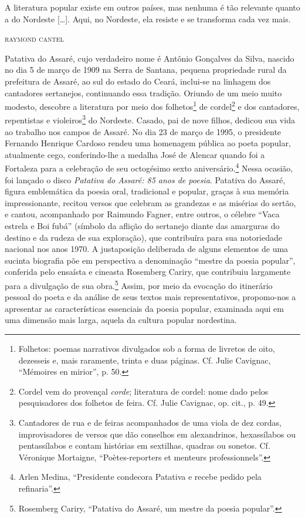 
\epigraph{A literatura popular existe em outros países, mas nenhuma é
tão relevante quanto a do Nordeste [\ldots{}]. Aqui, no Nordeste, ela
resiste e se transforma cada vez mais.}{\textsc{raymond cantel}\footnotemark}

\noindent{}Patativa do Assaré, cujo verdadeiro nome é Antônio Gonçalves da Silva, nascido
no dia 5 de março de 1909 na Serra de Santana, pequena propriedade rural da
prefeitura de Assaré, ao sul do estado do Ceará, inclui-se na linhagem dos
cantadores sertanejos, continuando essa tradição. Oriundo de um meio muito
modesto, descobre a literatura por meio dos folhetos\footnote{ Folhetos: poemas
narrativos divulgados sob a forma de livretos de oito, dezesseis e, mais
raramente, trinta e duas páginas. Cf. Julie Cavignac, ``Mémoires en
mirior'', p. 50.} de cordel\footnote{
Cordel vem do provençal \textit{corde}; literatura de cordel: nome dado pelos
pesquisadores dos folhetos de feira. Cf. Julie Cavignac, op. cit., p. 49.} e
dos cantadores, repentistas e violeiros\footnote{ Cantadores de rua e de feiras
acompanhados de uma viola de dez cordas, improvisadores de versos que dão
conselhos em alexandrinos, hexassílabos ou pentassílabos e contam histórias em
sextilhas, quadras ou sonetos. Cf. Véronique Mortaigne, “Poètes-reporters et
menteurs professionnels”.} do Nordeste. Casado, pai de nove filhos, dedicou sua
vida ao trabalho nos campos de Assaré. No dia 23 de março de
1995, o presidente Fernando Henrique Cardoso rendeu uma homenagem pública ao
poeta popular, atualmente cego, conferindo-lhe a medalha José de Alencar quando
foi a Fortaleza para a celebração de seu octogésimo sexto aniversário.\footnote{
Arlen Medina, “Presidente condecora Patativa e recebe pedido pela refinaria”.}
Nessa ocasião, foi lançado o disco \textit{Patativa do Assaré: 85 anos de poesia}.
Patativa do Assaré, figura emblemática da poesia oral, tradicional e popular,
graças à sua memória impressionante, recitou versos que celebram as grandezas e
as misérias do sertão, e cantou, acompanhado por Raimundo Fagner, entre outros, o
célebre “Vaca estrela e Boi fubá” (símbolo da aflição do sertanejo diante das
amarguras do destino e da rudeza de sua exploração), que contribuíra para sua
notoriedade nacional nos anos 1970. A justaposição deliberada de alguns
elementos de uma sucinta biografia põe em perspectiva a denominação “mestre da
poesia popular”, conferida pelo ensaísta e cineasta Rosemberg Cariry, que
contribuiu largamente para a divulgação de sua obra.\footnote{ Rosemberg Cariry,
“Patativa do Assaré, um mestre da poesia popular”.} Assim, por meio da evocação
do itinerário pessoal do poeta e da análise de seus textos mais representativos,
propomo-nos a apresentar as características essenciais da poesia popular,
examinada aqui em uma dimensão mais larga, aquela da cultura popular nordestina.


